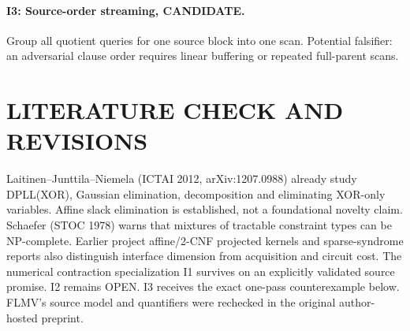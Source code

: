 \documentclass[11pt]{article}
\begin{document}
\paragraph{I3: Source-order streaming, CANDIDATE.}
Group all quotient queries for one source block into one scan.
Potential falsifier: an adversarial clause order requires linear
buffering or repeated full-parent scans.
\section{LITERATURE CHECK AND REVISIONS}
Laitinen--Junttila--Niemela (ICTAI 2012, arXiv:1207.0988)
already study DPLL(XOR), Gaussian elimination, decomposition
and eliminating XOR-only variables. Affine slack elimination is
established, not a foundational novelty claim. Schaefer (STOC
1978) warns that mixtures of tractable constraint types can be
NP-complete. Earlier project affine/2-CNF projected kernels and
sparse-syndrome reports also distinguish interface dimension from
acquisition and circuit cost. The numerical contraction
specialization I1 survives on an explicitly validated source
promise. I2 remains OPEN. I3 receives the exact one-pass
counterexample below. FLMV's source model and quantifiers were
rechecked in the original author-hosted preprint.
\end{document}
